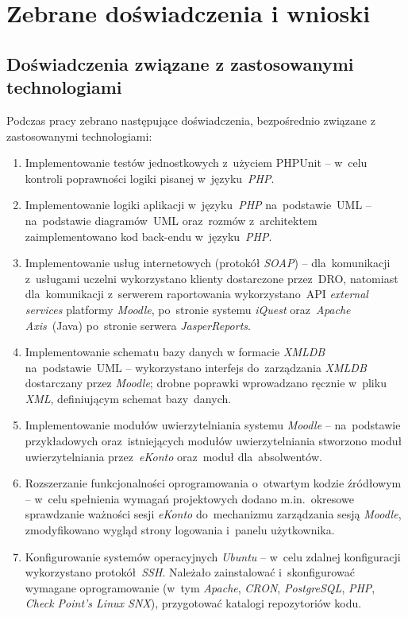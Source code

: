 \chapter{Zebrane doświadczenia i wnioski}
\label{Chapter8}

\section{Doświadczenia związane z zastosowanymi technologiami}
\label{Chapter81}

Podczas pracy zebrano następujące doświadczenia, bezpośrednio związane z zastosowanymi technologiami:

\begin{enumerate}
\item Implementowanie testów jednostkowych z~użyciem PHPUnit -- w~celu kontroli poprawności logiki pisanej w~języku~\textit{PHP}.
\item Implementowanie logiki aplikacji w~języku~\textit{PHP} na~podstawie~UML -- na~podstawie diagramów~UML oraz~rozmów z~architektem zaimplementowano kod back-endu w~języku~\textit{PHP}.
\item Implementowanie usług internetowych (protokół \textit{SOAP}) -- dla~komunikacji z~usługami uczelni wykorzystano klienty dostarczone przez~DRO, natomiast dla~komunikacji z~serwerem raportowania wykorzystano~API \textit{external services} platformy \textit{Moodle}, po~stronie systemu \textit{iQuest} oraz~\textit{Apache Axis}~(Java) po~stronie serwera \textit{JasperReports}.
\item Implementowanie schematu bazy danych w formacie \textit{XMLDB} na~podstawie~UML -- wykorzystano interfejs do~zarządzania \textit{XMLDB} dostarczany przez \textit{Moodle}; drobne poprawki wprowadzano ręcznie w~pliku \textit{XML}, definiującym schemat bazy~danych.
\item Implementowanie modułów uwierzytelniania systemu \textit{Moodle} -- na~podstawie przykładowych oraz~istniejących modułów uwierzytelniania stworzono moduł uwierzytelniania przez~\textit{eKonto} oraz~moduł dla~absolwentów.
\item Rozszerzanie funkcjonalności oprogramowania o~otwartym kodzie źródłowym -- w~celu spełnienia wymagań projektowych dodano m.in.~okresowe sprawdzanie ważności sesji \textit{eKonto} do~mechanizmu zarządzania sesją \textit{Moodle}, zmodyfikowano wygląd strony logowania i~panelu użytkownika.
\item Konfigurowanie systemów operacyjnych \textit{Ubuntu} -- w~celu zdalnej konfiguracji wykorzystano protokół~\textit{SSH}. Należało zainstalować i~skonfigurować wymagane oprogramowanie (w~tym \textit{Apache}, \textit{CRON}, \textit{PostgreSQL}, \textit{PHP}, \textit{Check Point's Linux SNX}), przygotować katalogi repozytoriów kodu.

\end{enumerate}
